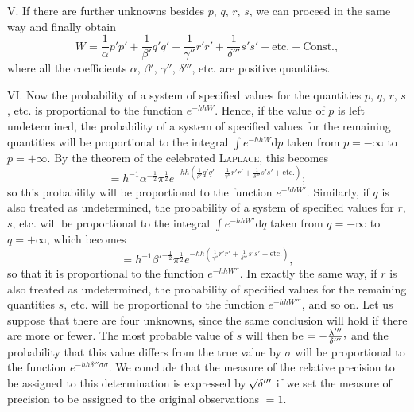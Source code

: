 V. If there are further unknowns besides $p$, $q$, $r$, $s$, we can proceed in the same way and finally obtain
\[
W=\frac{1}{\alpha}p'p'+\frac{1}{\beta'}q'q'+\frac{1}{\gamma''}r'r'
+\frac{1}{\delta'''}s's'+\text{etc.}+\text{Const.},
\]
where all the coefficients $\alpha$, $\beta'$, $\gamma''$, $\delta'''$, etc. are positive quantities.

VI. Now the probability of a system of specified values for the quantities $p$, $q$, $r$, $s$, etc. is proportional\HistoricalNoteEight{Manuscript note:] \emph{Equal} [to the product] of the function[\quad\raisebox{.65ex}{.}
\[
e^{-hh\left(\frac{1}{\alpha}p'p'+\frac{1}{\beta'}q'q'+\frac{1}{\gamma''}r'r'+\frac{1}{\delta'''}s's'+\text{etc.}\right)}
\]
and the constant factor]
$\frac{h^\nu\BareRoot{(\alpha\beta'\gamma''\delta'''\ldots)}}{(\BareRoot{\pi})^\nu}e^{-hh\,\text{Const.}}$,
where Const. denotes the last, constant part of $W$.}
 to the function $e^{-hhW}$. Hence,
if the value of $p$ is left undetermined, the probability of a system of specified values for the remaining quantities will be proportional to the integral $\int e^{-hhW}\mathrm{d}p$ taken from $p=-\infty$ to $p=+\infty$. By the theorem of the celebrated \textsc{Laplace}, this becomes
\[
=h^{-1}\alpha^{-\frac12}\pi^{\frac12}
e^{-hh\left(\frac{1}{\beta'}q'q'+\frac{1}{\gamma''}r'r'+\frac{1}{\delta'''}s's'+\text{etc.}\right)};
\]
so this probability will be proportional to the function $e^{-hhW'}$.
Similarly, if $q$ is also treated as undetermined, the probability of a system of specified values for $r$, $s$, etc. will be proportional to the integral $\int e^{-hhW'}\mathrm{d}q$ taken from $q=-\infty$ to $q=+\infty$, which becomes
\[
=h^{-1}{\beta'}^{-\frac12}\pi^{\frac12}
e^{-hh\left(\frac{1}{\gamma''}r'r'+\frac{1}{\delta'''}s's'+\text{etc.}\right)},
\]
so that it is proportional to the function $e^{-hhW''}$. In exactly the same way, if $r$ is also treated as undetermined, the probability of specified values for the remaining quantities $s$, etc. will be proportional to the function $e^{-hhW'''}$, and so on. Let us suppose that there are four unknowns, since the same conclusion will hold if there are more or fewer. The most probable value of $s$ will then be
$=-\frac{\lambda'''}{\delta'''}\mathpunct{\raisebox{.45ex}{,}}$
and the probability that this value differs from the true value by $\sigma$ will be proportional to the function $e^{-hh\delta'''\sigma\sigma}$. We conclude that the measure of the relative precision to be assigned to this determination is expressed by $\mathord{{}^{}\!\surd}\delta'''$ if we set the measure of precision to be assigned to the original observations $=1$.

